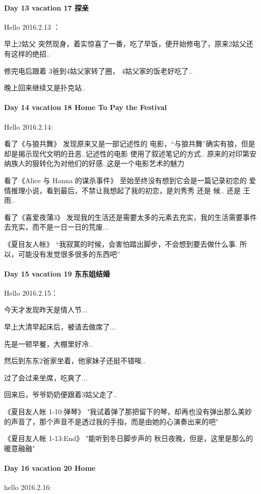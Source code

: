 \documentclass[UTF8,a4paper,8pt]{ctexbook}
\begin{document}
 	 \paragraph{Day 13  vacation 17    \quad   探亲  }
	 	 Hello 2016.2.13 ：
	 	 
	 	 早上2姑父 突然现身，着实惊喜了一番，吃了早饭，便开始修电了，原来2姑父还有这样的绝招..
	 	 
	 	 修完电后跟着 3爸到4姑父家转了圈， 4姑父家的饭老好吃了..
	 	 
	 	 晚上回来继续又是扑克站..
 	 \paragraph{Day 14  vacation 18    \quad   Home To Pay the Festival}
	 	 Hello 2016.2.14:
	 	 
	 	 看了《与狼共舞》 发现原来又是一部记述性的 电影，“与狼共舞”确实有狼，但是却是揭示现代文明的丑恶..记述性的电影 使用了叙述笔记的方式..  原来的对印第安纳族人的狠转化为对他们的好感..这是一个电影艺术的魅力
	 	 
	 	 看了《Alice 与 Hanna 的谋杀事件》 至始至终没有想到它会是一篇记录初恋的 爱情推理小说，看到最后，不禁让我想起了我的初恋，是刘秀秀 还是 候.. 还是 王雨..
	 	 
	 	 看了《喜爱夜蒲3》 发现我的生活还是需要太多的元素去充实，我的生活需要事件去充实，而不是一日一日的荒废...
	 	 
	 	 《夏目友人帐》  “我寂寞的时候，会害怕踏出脚步，不会想到要去做什么事.  所以，可能没有发觉很多很多的东西吧”
 	 \paragraph{Day 15  vacation 19    \quad    东东姐结婚 }
	 	 Hello 2016.2.15：
	 	 
	 	 今天才发现昨天是情人节...
	 	 
	 	 早上大清早起床后，被请去做席了...
	 	 
	 	 先是一顿早餐，大棚里好冷..
	 	 
	 	 然后到东东2爸家坐着，他家妹子还挺不错唉..
	 	 
	 	 过了会过来坐席，吃爽了...
	 	 
	 	 回来后，爷爷奶奶便跟着3姑父走了..
	 	 
	 	 《夏目友人帐 1-10:弹琴》 "我试着弹了那把留下的琴，却再也没有弹出那么美妙的声音了，那个声音不是透过我的手指，而是由她的心演奏出来的吧"
	 	 
	 	 《夏目友人帐 1-13:End》 "能听到冬日脚步声的 秋日夜晚，但是，这里是那么的暖意融融"
 	 \paragraph{Day 16  vacation 20    \quad  Home   }
	 	 hello 2016.2.16:
	 	 
\end{document}
